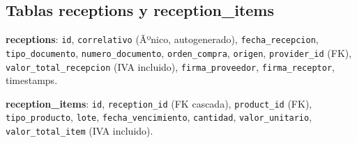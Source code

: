 ﻿\documentclass[a4paper, 12pt]{article}
\begin{document}
\subsection{Tablas receptions y reception\_items}
\textbf{receptions}: \texttt{id}, \texttt{correlativo} (Ãºnico, autogenerado), \texttt{fecha\_recepcion}, \texttt{tipo\_documento}, \texttt{numero\_documento}, \texttt{orden\_compra}, \texttt{origen}, \texttt{provider\_id} (FK), \texttt{valor\_total\_recepcion} (IVA incluido), \texttt{firma\_proveedor}, \texttt{firma\_receptor}, timestamps.

\textbf{reception\_items}: \texttt{id}, \texttt{reception\_id} (FK cascada), \texttt{product\_id} (FK), \texttt{tipo\_producto}, \texttt{lote}, \texttt{fecha\_vencimiento}, \texttt{cantidad}, \texttt{valor\_unitario}, \texttt{valor\_total\_item} (IVA incluido).
\end{document}
